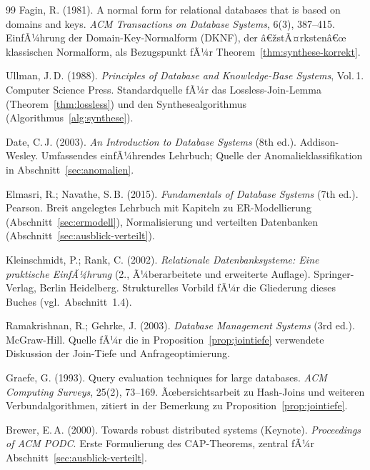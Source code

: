 ﻿\documentclass[a4paper,12pt]{report}
\theoremstyle{definition}
\theoremstyle{remark}
\begin{document}
\begin{thebibliography}{99}
Fagin, R. (1981).
\newblock A normal form for relational databases that is based on domains
and keys.
\newblock \emph{ACM Transactions on Database Systems}, 6(3), 387--415.
\newblock EinfÃ¼hrung der Domain-Key-Normalform (DKNF), der
â€žstÃ¤rkstenâ€œ klassischen Normalform, als Bezugspunkt fÃ¼r
Theorem~\ref{thm:synthese-korrekt}.

Ullman, J.\,D. (1988).
\newblock \emph{Principles of Database and Knowledge-Base Systems}, Vol.\,1.
\newblock Computer Science Press.
\newblock Standardquelle fÃ¼r das Lossless-Join-Lemma
(Theorem~\ref{thm:lossless}) und den Synthesealgorithmus
(Algorithmus~\ref{alg:synthese}).

Date, C.\,J. (2003).
\newblock \emph{An Introduction to Database Systems} (8th ed.).
\newblock Addison-Wesley.
\newblock Umfassendes einfÃ¼hrendes Lehrbuch; Quelle der
Anomalieklassifikation in Abschnitt~\ref{sec:anomalien}.

Elmasri, R.; Navathe, S.\,B. (2015).
\newblock \emph{Fundamentals of Database Systems} (7th ed.).
\newblock Pearson.
\newblock Breit angelegtes Lehrbuch mit Kapiteln zu ER-Modellierung
(Abschnitt~\ref{sec:ermodell}), Normalisierung und verteilten
Datenbanken (Abschnitt~\ref{sec:ausblick-verteilt}).

Kleinschmidt, P.; Rank, C. (2002).
\newblock \emph{Relationale Datenbanksysteme: Eine praktische EinfÃ¼hrung}
(2., Ã¼berarbeitete und erweiterte Auflage).
\newblock Springer-Verlag, Berlin Heidelberg.
\newblock Strukturelles Vorbild fÃ¼r die Gliederung dieses Buches
(vgl.\ Abschnitt~1.4).

Ramakrishnan, R.; Gehrke, J. (2003).
\newblock \emph{Database Management Systems} (3rd ed.).
\newblock McGraw-Hill.
\newblock Quelle fÃ¼r die in Proposition~\ref{prop:jointiefe} verwendete
Diskussion der Join-Tiefe und Anfrageoptimierung.

Graefe, G. (1993).
\newblock Query evaluation techniques for large databases.
\newblock \emph{ACM Computing Surveys}, 25(2), 73--169.
\newblock Ãœbersichtsarbeit zu Hash-Joins und weiteren
Verbundalgorithmen, zitiert in der Bemerkung zu
Proposition~\ref{prop:jointiefe}.

Brewer, E.\,A. (2000).
\newblock Towards robust distributed systems (Keynote).
\newblock \emph{Proceedings of ACM PODC}.
\newblock Erste Formulierung des CAP-Theorems, zentral fÃ¼r
Abschnitt~\ref{sec:ausblick-verteilt}.


\end{thebibliography}
\end{document}
